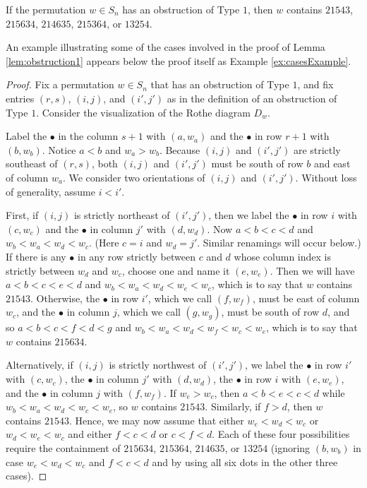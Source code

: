 \documentclass[ALCO,Unicode,published]{cedram}
\begin{document}
\begin{lemma}\label{lem:obstruction1} 
If the permutation $w \in S_n$ has an obstruction of Type $1$, then $w$ contains $21543$, $215634$, $214635$, $215364$, or $13254$.
\end{lemma}

An example illustrating some of the cases involved in the proof of Lemma \ref{lem:obstruction1} appears below the proof itself as Example \ref{ex:casesExample}.

\begin{proof}
Fix a permutation $w \in S_n$ that has an obstruction of Type $1$, and fix entries $(r,s)$, $(i,j)$, and $(i',j')$ as in the definition of an obstruction of Type $1$.  Consider the visualization of the Rothe diagram $D_w$.

Label the $\bullet$ in the column $s+1$ with $(a,w_a)$ and the $\bullet$ in row $r+1$ with $(b,w_b)$.  Notice $a<b$ and $w_a>w_b$.   Because $(i,j)$ and $(i',j')$ are strictly southeast of $(r,s)$, both $(i,j)$ and $(i',j')$ must be south of row $b$ and east of column $w_a$.  We consider two orientations of $(i,j)$ and $(i',j')$.  Without loss of generality, assume $i<i'$.

First, if $(i,j)$ is strictly northeast of $(i',j')$, then we label the $\bullet$ in row $i$ with $(c,w_c)$ and the $\bullet$ in column $j'$ with $(d,w_d)$.  Now $a<b<c<d$ and $w_b<w_a<w_d<w_c$.  (Here $c=i$ and $w_d = j'$.  Similar renamings will occur below.)  If there is any $\bullet$ in any row strictly between $c$ and $d$ whose column index is strictly between $w_d$ and $w_c$, choose one and name it $(e,w_e)$.  Then we will have $a<b<c<e<d$ and $w_b<w_a<w_d<w_e<w_c$, which is to say that $w$ contains $21543$.  Otherwise, the $\bullet$ in row $i'$, which we call $(f,w_f)$, must be east of column $w_c$, and the $\bullet$ in column $j$, which we call $(g,w_g)$, must be south of row $d$, and so $a<b<c<f<d<g$ and $w_b<w_a<w_d<w_f<w_c<w_e$, which is to say that $w$ contains $215634$.

Alternatively, if $(i,j)$ is strictly northwest of $(i',j')$, we label the $\bullet$ in row $i'$ with $(c, w_c)$, the $\bullet$ in column $j'$ with $(d,w_d)$, the $\bullet$ in row $i$ with $(e,w_e)$, and the $\bullet$ in column $j$ with $(f,w_f)$.  If $w_e>w_c$, then $a<b<e<c<d$ while $w_b<w_a<w_d<w_c<w_e$, so $w$ contains $21543$.  Similarly, if $f>d$, then $w$ contains $21543$.  Hence, we may now assume that either $w_e<w_d<w_c$ or $w_d<w_e<w_c$ and either $f<c<d$ or $c<f<d$.  Each of these four possibilities require the containment of $215634$, $215364$, $214635$, or $13254$ (ignoring $(b,w_b)$ in case $w_e<w_d<w_c$ and $f<c<d$ and by using all six dots in the other three cases).
\end{proof}
\end{document}

